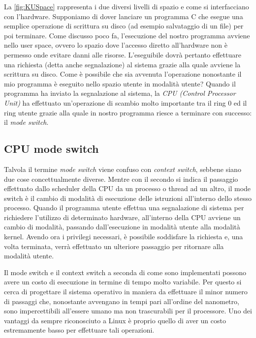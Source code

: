 La \autoref{fig:KUSpace} rappresenta i due diversi livelli di spazio e come si interfacciano con l'hardware.
Supponiamo di dover lanciare un programma C che esegue una semplice operazione di scrittura su disco (ad esempio salvataggio di un file) per poi terminare. Come discusso poco fa, l'esecuzione del nostro programma avviene nello user space, ovvero lo spazio dove l'accesso diretto all'hardware non è permesso onde evitare danni alle risorse. L'eseguibile dovrà pertanto effettuare una richiesta (detta anche segnalazione) al sistema grazie alla quale avviene la scrittura su disco. Come è possibile che sia avvenuta l'operazione nonostante il mio programma è eseguito nello spazio utente in modalità utente?
Quando il programma ha inviato la segnalazione al sistema, la \emph{CPU (Control Processor Unit)} ha effettuato un'operazione di scambio molto importante tra il ring 0 ed il ring utente grazie alla quale in nostro programma riesce a terminare con successo: il \emph{mode switch}.

\subsection{CPU mode switch}

Talvola il termine \emph{mode switch} viene confuso con \emph{context switch}, sebbene siano due cose concettualmente diverse. Mentre con il secondo si indica il passaggio effettuato dallo scheduler della CPU da un processo o thread ad un altro, il mode switch è il cambio di modalità di esecuzione delle istruzioni all'interno dello stesso processo. Quando il programma utente effettua una segnalazione di sistema per richiedere l'utilizzo di determinato hardware, all'interno della CPU avviene un cambio di modalità, passando dall'esecuzione in modalità utente alla modalità kernel. Avendo ora i privilegi necessari, è possibile soddisfare la richiesta e, una volta terminata, verrà effettuato un ulteriore passaggio per ritornare alla modalità utente.

Il mode switch e il context switch a seconda di come sono implementati possono avere un costo di esecuzione in termine di tempo molto variabile. Per questo si cerca di progettare il sistema operativo in maniera da effettuare il minor numero di passaggi che, nonostante avvengano in tempi pari all'ordine del nanometro, sono impercettibili all'essere umano ma non trascurabili per il processore.
Uno dei vantaggi da sempre riconosciuto a Linux è proprio quello di aver un costo estremamente basso per effettuare tali operazioni.

